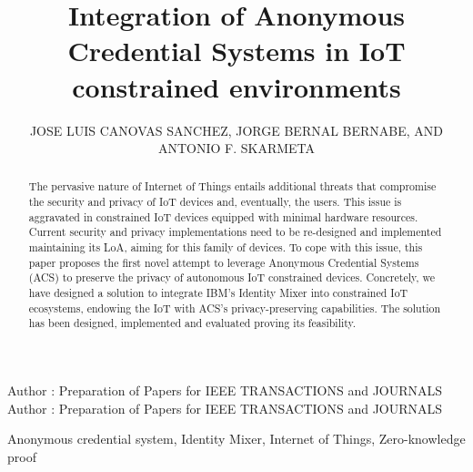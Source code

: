 \documentclass{ieeeaccess}
\begin{document}

\title{Integration of Anonymous Credential Systems in IoT constrained environments}
\author{\uppercase{Jose Luis Canovas Sanchez},
\uppercase{Jorge Bernal Bernabe, and Antonio F. Skarmeta}
}
\address{Department of Information and Communications Engineering\\
	Computer Science Faculty, 
	University of Murcia, Spain\\
	\{joseluiscanovas, jorgebernal, skarmeta\}@um.es\\
}

\markboth
{Author \headeretal: Preparation of Papers for IEEE TRANSACTIONS and JOURNALS}
{Author \headeretal: Preparation of Papers for IEEE TRANSACTIONS and JOURNALS}


\begin{abstract}
The pervasive nature of Internet of Things entails additional threats that compromise the security and privacy of IoT devices and, eventually, the users. This issue is aggravated in constrained IoT devices equipped with minimal hardware resources. Current security and privacy implementations need to be re-designed and implemented maintaining its LoA, aiming for this family of devices. To cope with this issue, this paper proposes the first novel attempt to leverage Anonymous Credential Systems (ACS) to preserve the privacy of autonomous IoT constrained devices. Concretely, we have designed a solution to integrate IBM's Identity Mixer into constrained IoT ecosystems, endowing the IoT with ACS's privacy-preserving capabilities. The solution has been designed, implemented and evaluated proving its feasibility.
\end{abstract}

\begin{keywords}
Anonymous credential system, Identity Mixer, Internet of Things, Zero-knowledge proof
\end{keywords}
\end{document}
